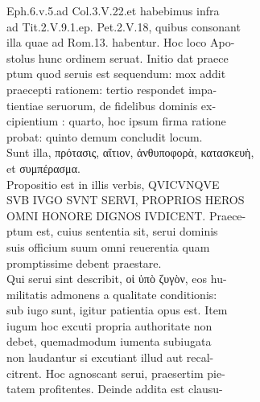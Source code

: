 \documentclass{article}
\begin{document}
\begin{pages}
                Eph.6.v.5.ad Col.3.V.22.et habebimus infra \\
                ad Tit.2.V.9.1.ep. Pet.2.V.18, quibus consonant \\
                illa quae ad Rom.13. habentur. Hoc loco Apo- \\
                stolus hunc ordinem seruat. Initio dat praece \\
                ptum quod seruis est sequendum: mox addit \\
                praecepti rationem: tertio respondet impa- \\
                tientiae seruorum, de fidelibus dominis ex- \\
                cipientium : quarto, hoc ipsum firma ratione \\
                probat: quinto demum concludit locum. \\
                Sunt illa, πρότασις, αἴτιον, ἀνθυποφορὰ, κατασκευὴ, \\
                et συμπέρασμα. \\
                Propositio est in illis verbis, QVICVNQVE \\
                SVB IVGO SVNT SERVI, PROPRIOS HEROS \\
                OMNI HONORE DIGNOS IVDICENT. Praece- \\
                ptum est, cuius sententia sit, serui dominis \\
                suis officium suum omni reuerentia quam \\
                promptissime debent praestare. \\
                Qui serui sint describit, οἱ ὑπὸ ζυγὸν, eos hu- \\
                militatis admonens a qualitate conditionis: \\
                sub iugo sunt, igitur patientia opus est. Item \\
                iugum hoc excuti propria authoritate non \\
                debet, quemadmodum iumenta subiugata \\
                non laudantur si excutiant illud aut recal- \\
                citrent. Hoc agnoscant serui, praesertim pie- \\
                tatem profitentes. Deinde addita est clausu- \\

\end{pages}
\end{document}

